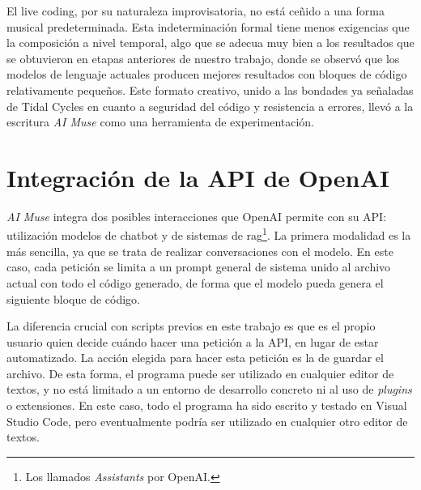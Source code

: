 El live coding, por su naturaleza improvisatoria, no está ceñido a una forma musical predeterminada. Esta indeterminación formal tiene menos exigencias que la composición a nivel temporal, algo que se adecua muy bien a los resultados que se obtuvieron en etapas anteriores de nuestro trabajo, donde se observó que los modelos de lenguaje actuales producen mejores resultados con bloques de código relativamente pequeños. Este formato creativo, unido a las bondades ya señaladas de Tidal Cycles en cuanto a seguridad del código y resistencia a errores, llevó a la escritura \emph{AI Muse} como una herramienta de experimentación.


\section{Integración de la API de OpenAI}

\emph{AI Muse} integra dos posibles interacciones que OpenAI permite con su API: utilización modelos de chatbot y de sistemas de \gls{rag}\footnote{Los llamados \emph{Assistants} por OpenAI.}. La primera modalidad es la más sencilla, ya que se trata de realizar conversaciones con el modelo. En este caso, cada petición se limita a un prompt general de sistema unido al archivo actual con todo el código generado, de forma que el modelo pueda genera el siguiente bloque de código.

La diferencia crucial con scripts previos en este trabajo es que es el propio usuario quien decide cuándo hacer una petición a la API, en lugar de estar automatizado. La acción elegida para hacer esta petición es la de guardar el archivo. De esta forma, el programa puede ser utilizado en cualquier editor de textos, y no está limitado a un entorno de desarrollo concreto ni al uso de \emph{plugins} o extensiones. En este caso, todo el programa ha sido escrito y testado en Visual Studio Code, pero eventualmente podría ser utilizado en cualquier otro editor de textos.

